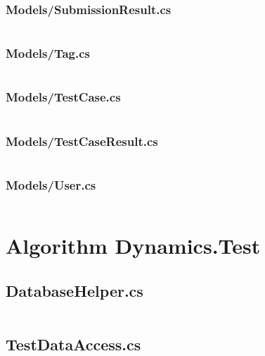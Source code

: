 \documentclass[a4paper]{report}
\begin{document}
\inputminted{csharp}{"../src/Algorithm Dynamics.Core/Models/Submission.cs"}

\subsubsection{Models/SubmissionResult.cs}

\inputminted{csharp}{"../src/Algorithm Dynamics.Core/Models/SubmissionResult.cs"}

\subsubsection{Models/Tag.cs}

\inputminted{csharp}{"../src/Algorithm Dynamics.Core/Models/Tag.cs"}

\subsubsection{Models/TestCase.cs}

\inputminted{csharp}{"../src/Algorithm Dynamics.Core/Models/TestCase.cs"}

\subsubsection{Models/TestCaseResult.cs}

\inputminted{csharp}{"../src/Algorithm Dynamics.Core/Models/TestCaseResult.cs"}

\subsubsection{Models/User.cs}

\inputminted{csharp}{"../src/Algorithm Dynamics.Core/Models/User.cs"}

\section{Algorithm Dynamics.Test}

\subsection{DatabaseHelper.cs}

\inputminted{csharp}{"../src/Algorithm Dynamics.Test/DatabaseHelper.cs"}

\subsection{TestDataAccess.cs}
\end{document}
